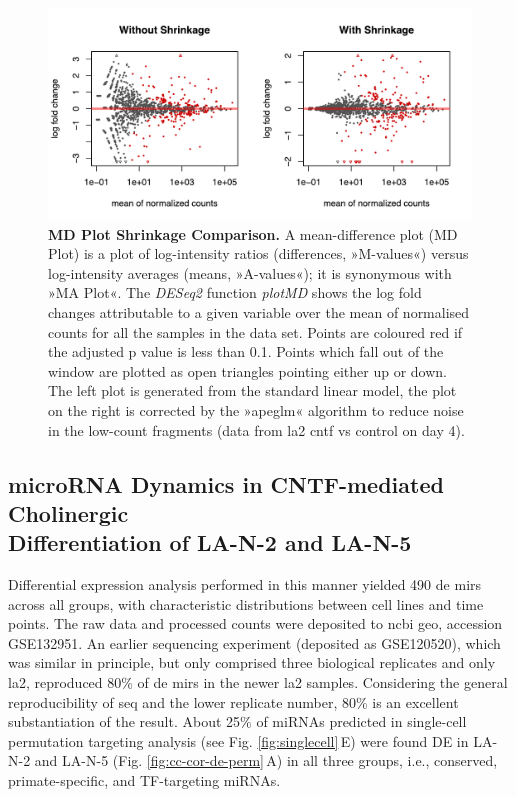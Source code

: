 \begin{figure}[ht]
\centering
\includegraphics[width=\textwidth]{figures/apeglm-comp-la2d4}
\caption[MD Plot Shrinkage Comparison.]{\textbf{MD Plot Shrinkage Comparison.} A mean-difference plot (MD Plot) is a plot of log-intensity ratios (differences, »M-values«) versus log-intensity averages (means, »A-values«); it is synonymous with »MA Plot«. The \textit{DESeq2} function \textit{plotMD} shows the log fold changes attributable to a given variable over the mean of normalised counts for all the samples in the data set. Points are coloured red if the adjusted p value is less than 0.1. Points which fall out of the window are plotted as open triangles pointing either up or down. The left plot is generated from the standard linear model, the plot on the right is corrected by the »apeglm« algorithm\cite{Zhu2019} to reduce noise in the low-count fragments (data from \ac{la2} \ac{cntf} vs control on day 4).
\label{fig:apeglm-comp-la2d4}}
\end{figure}

\subsection{microRNA Dynamics in CNTF-mediated Cholinergic\\ Differentiation of LA-N-2 and LA-N-5} \label{sec:cellculture:de}
Differential expression analysis performed in this manner yielded 490 \ac{de} \acp{mir} across all groups, with characteristic distributions between cell lines and time points. The raw data and processed counts were deposited to \ac{ncbi} \ac{geo}, accession GSE132951. An earlier sequencing experiment (deposited as GSE120520), which was similar in principle, but only comprised three biological replicates and only \ac{la2}, reproduced 80\% of \ac{de} \acp{mir} in the newer \ac{la2} samples. Considering the general reproducibility of \ac{seq} and the lower replicate number, 80\% is an excellent substantiation of the result. About 25\% of miRNAs predicted in single-cell permutation targeting analysis (see Fig. \ref{fig:singlecell}\,E) were found DE in LA-N-2 and LA-N-5 (Fig. \ref{fig:cc-cor-de-perm}\,A) in all three groups, i.e., conserved, primate-specific, and TF-targeting miRNAs.  

